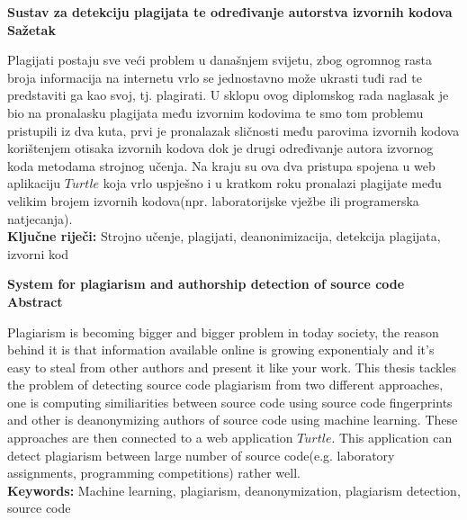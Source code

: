 \begin{center}
\textbf{Sustav za detekciju plagijata te određivanje autorstva izvornih kodova} \\
\textbf{Sažetak}
\end{center}

	Plagijati postaju sve veći problem u današnjem svijetu, zbog ogromnog rasta broja informacija na internetu vrlo se jednostavno može ukrasti tuđi rad te predstaviti ga kao svoj, tj. plagirati. U sklopu ovog diplomskog rada naglasak je bio na pronalasku plagijata među izvornim kodovima te smo tom problemu pristupili iz dva kuta, prvi je pronalazak sličnosti među parovima izvornih kodova korištenjem otisaka izvornih kodova dok je drugi određivanje autora izvornog koda metodama strojnog učenja. Na kraju su ova dva pristupa spojena u web aplikaciju $Turtle$ koja vrlo uspješno i u kratkom roku pronalazi plagijate među velikim brojem izvornih kodova(npr. laboratorijske vježbe ili programerska natjecanja). \\
	
\noindent \textbf{Ključne riječi:} Strojno učenje, plagijati, deanonimizacija, detekcija plagijata, izvorni kod

\begin{center}
\textbf{System for plagiarism and authorship detection of source code} \\
\textbf{Abstract}
\end{center}

	Plagiarism is becoming bigger and bigger problem in today society, the reason behind it is that information available online is growing exponentialy and it's easy to steal from other authors and present it like your work. This thesis tackles the problem of detecting source code plagiarism from two different approaches, one is computing similiarities between source code using source code fingerprints and other is deanonymizing authors of source code using machine learning. These approaches are then connected to a web application $Turtle$. This application can detect plagiarism between large number of source code(e.g. laboratory assignments, programming competitions) rather well. \\
	
\noindent \textbf{Keywords:} Machine learning, plagiarism, deanonymization, plagiarism detection, source code